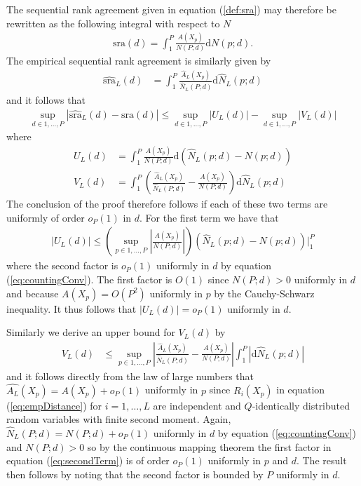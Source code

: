 \documentclass[12pt,a4paper]{article}
\theoremstyle{plain}
\begin{document}
The sequential rank agreement given in equation
(\ref{def:sra}) may therefore be rewritten as the following integral
with respect to $N$
\begin{align}
  \textrm{sra}(d) = \int_{1}^P \frac{A(X_p)}{N(P; d)}\mathrm dN(p; d).
\end{align}
The empirical sequential rank agreement is similarly given by
\begin{align}
  \widehat{\textrm{sra}}_L(d) &= \int_1^P \frac{\widehat{A}_L(X_p)}{\widehat{N}_L(P; d)}\mathrm d \widehat{N}_L(p; d) 
\end{align}
and it follows that
\begin{align}
  \sup_{d \in 1,\ldots,P}\left|\widehat{\textrm{sra}}_L(d) - \textrm{sra}(d)\right| \leq \sup_{d \in 1,\ldots,P}\left|U_L(d)\right| - \sup_{d \in 1,\ldots,P}\left|V_L(d)\right|
\end{align}
where
\begin{align}
  U_L(d) &= \int_1^P\frac{A(X_p)}{N(P;d)} \mathrm d\left(\widehat{N}_L(p; d) - N(p; d)\right)\\
  V_L(d) &=  \int_1^P \left(\frac{\widehat{A}_L(X_p)}{\widehat{N}_L(P; d)} - \frac{A(X_p)}{N(P;d)}\right)\mathrm d\widehat{N}_L(p; d)
\end{align}
The conclusion of the proof therefore follows if each of these two
terms are uniformly of order $o_P(1)$ in $d$.  For the first term we
have that
\begin{align}
  \left|U_L(d)\right| \leq \left(\sup_{p \in 1,\ldots,P}\left|\frac{A(X_p)}{N(P;d)}\right|\right)\left(\widehat{N}_L(p; d) - N(p; d)\right)\biggr\rvert_1^P
\end{align}
where the second factor is $o_P(1)$ uniformly in $d$ by equation
(\ref{eq:countingConv}). The first factor is $O(1)$ since $N(P;d)>0$
uniformly in $d$ and because $A(X_p) = O(P^2)$ uniformly in $p$ by the Cauchy-Schwarz inequality. It
thus follows that $\left|U_L(d)\right| = o_P(1)$ uniformly in $d$.

Similarly we derive an upper bound for $V_L(d)$ by
\begin{align}
 V_L(d) &\leq \sup_{p \in 1,\ldots,P}\left|\frac{\widehat{A}_L(X_p)}{\widehat{N}_L(P; d)} - \frac{A(X_p)}{N(P;d)}\right| \int_1^P \left|\mathrm d\widehat{N}_L(p; d)\right|\label{eq:secondTerm}
\end{align}
and it follows directly from the law of large numbers that
$\widehat{A_L}(X_p) = A(X_p) + o_P(1)$ uniformly in $p$ since
$R_i(X_p)$ in equation (\ref{eq:empDistance}) for $i=1,\ldots,L$ are
independent and $Q$-identically distributed random variables with
finite second moment. Again, $\widehat{N}_L(P; d) = N(P;d) + o_P(1)$ uniformly in $d$ by equation
(\ref{eq:countingConv}) and $N(P;d)>0$ so by the continuous mapping theorem the first factor
in equation (\ref{eq:secondTerm}) is of order $o_P(1)$ uniformly in
$p$ and $d$. The result then follows by noting that the second factor
is bounded by $P$ uniformly in $d$. 
\end{document}
